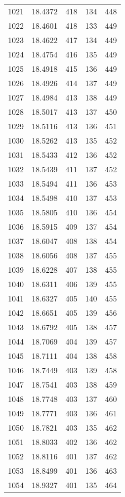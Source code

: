 \documentclass[12pt,a4paper]{article}
\begin{document}
\begin{tabular}{r|cccc}
	1021 & 18.4372 & 418 & 134 & 448 \\
	1022 & 18.4601 & 418 & 133 & 449 \\
	1023 & 18.4622 & 417 & 134 & 449 \\
	1024 & 18.4754 & 416 & 135 & 449 \\
	1025 & 18.4918 & 415 & 136 & 449 \\
	1026 & 18.4926 & 414 & 137 & 449 \\
	1027 & 18.4984 & 413 & 138 & 449 \\
	1028 & 18.5017 & 413 & 137 & 450 \\
	1029 & 18.5116 & 413 & 136 & 451 \\
	1030 & 18.5262 & 413 & 135 & 452 \\
	1031 & 18.5433 & 412 & 136 & 452 \\
	1032 & 18.5439 & 411 & 137 & 452 \\
	1033 & 18.5494 & 411 & 136 & 453 \\
	1034 & 18.5498 & 410 & 137 & 453 \\
	1035 & 18.5805 & 410 & 136 & 454 \\
	1036 & 18.5915 & 409 & 137 & 454 \\
	1037 & 18.6047 & 408 & 138 & 454 \\
	1038 & 18.6056 & 408 & 137 & 455 \\
	1039 & 18.6228 & 407 & 138 & 455 \\
	1040 & 18.6311 & 406 & 139 & 455 \\
	1041 & 18.6327 & 405 & 140 & 455 \\
	1042 & 18.6651 & 405 & 139 & 456 \\
	1043 & 18.6792 & 405 & 138 & 457 \\
	1044 & 18.7069 & 404 & 139 & 457 \\
	1045 & 18.7111 & 404 & 138 & 458 \\
	1046 & 18.7449 & 403 & 139 & 458 \\
	1047 & 18.7541 & 403 & 138 & 459 \\
	1048 & 18.7748 & 403 & 137 & 460 \\
	1049 & 18.7771 & 403 & 136 & 461 \\
	1050 & 18.7821 & 403 & 135 & 462 \\
	1051 & 18.8033 & 402 & 136 & 462 \\
	1052 & 18.8116 & 401 & 137 & 462 \\
	1053 & 18.8499 & 401 & 136 & 463 \\
	1054 & 18.9327 & 401 & 135 & 464 \\

\end{tabular}
\end{document}

